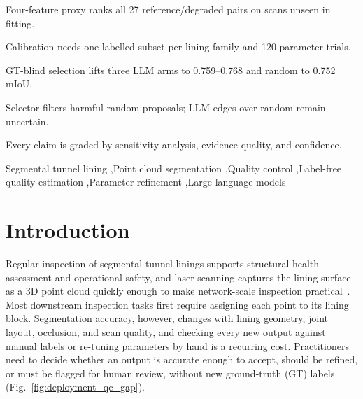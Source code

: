 \documentclass[a4paper,fleqn]{cas-dc}
\begin{document}

\begin{highlights}
\item Four-feature proxy ranks all 27 reference/degraded pairs on scans unseen in fitting.
\item Calibration needs one labelled subset per lining family and 120 parameter trials.
\item GT-blind selection lifts three LLM arms to 0.759--0.768 and random to 0.752 mIoU.
\item Selector filters harmful random proposals; LLM edges over random remain uncertain.
\item Every claim is graded by sensitivity analysis, evidence quality, and confidence.
\end{highlights}

\begin{keywords}
Segmental tunnel lining \sep Point cloud segmentation \sep Quality control \sep Label-free quality estimation \sep Parameter refinement \sep Large language models
\end{keywords}
\date{\today}

\maketitle

\section{Introduction}
\label{sec:intro}

Regular inspection of segmental tunnel linings supports structural health assessment and operational safety, and laser scanning captures the lining surface as a 3D point cloud quickly enough to make network-scale inspection practical~\cite{attard2018,montero2015,strauss2020sensing,huang2021bim,sjolander2023towards,weidner2024generalized}. Most downstream inspection tasks first require assigning each point to its lining block. Segmentation accuracy, however, changes with lining geometry, joint layout, occlusion, and scan quality, and checking every new output against manual labels or re-tuning parameters by hand is a recurring cost. Practitioners need to decide whether an output is accurate enough to accept, should be refined, or must be flagged for human review, without new ground-truth (GT) labels (Fig.~\ref{fig:deployment_qc_gap}).
\end{document}
